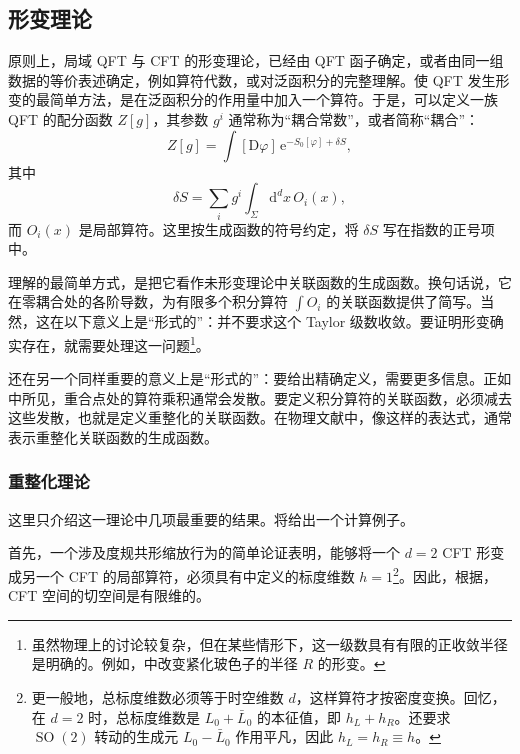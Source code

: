 \subsection{形变理论}\label{sec:3.2.5}

原则上，局域 QFT 与 CFT 的形变理论，已经由 QFT 函子确定，或者由同一组数据的等价表述确定，例如算符代数，或对泛函积分的完整理解。使 QFT 发生形变的最简单方法，是在泛函积分的作用量中加入一个算符。于是，可以定义一族 QFT 的配分函数 $Z[g]$，其参数 $g^i$ 通常称为“耦合常数”，或者简称“耦合”：
\begin{equation}\label{eq:3.71}
Z[g]=\int[\mathrm{D}\varphi]\,
\mathrm{e}^{-S_0[\varphi]+\delta S},
\end{equation}
其中
\begin{equation}\label{eq:3.72}
\delta S=\sum_i g^i\int_\Sigma\mathrm{d}^dx\,O_i(x),
\end{equation}
而 $O_i(x)$ 是局部算符。这里按生成函数的符号约定，将 $\delta S$ 写在指数的正号项中。

理解的最简单方式，是把它看作未形变理论中关联函数的生成函数。换句话说，它在零耦合处的各阶导数，为有限多个积分算符 $\int O_i$ 的关联函数提供了简写。当然，这在以下意义上是“形式的”：并不要求这个 Taylor 级数收敛。要证明形变确实存在，就需要处理这一问题\footnote{虽然物理上的讨论较复杂，但在某些情形下，这一级数具有有限的正收敛半径是明确的。例如，中改变紧化玻色子的半径 $R$ 的形变。}。

还在另一个同样重要的意义上是“形式的”：要给出精确定义，需要更多信息。正如中所见，重合点处的算符乘积通常会发散。要定义积分算符的关联函数，必须减去这些发散，也就是定义重整化的关联函数。在物理文献中，像这样的表达式，通常表示重整化关联函数的生成函数。

\subsubsection{重整化理论}\label{sec:3.2.5.1}

这里只介绍这一理论中几项最重要的结果。将给出一个计算例子。

首先，一个涉及度规共形缩放行为的简单论证表明，能够将一个 $d=2$ CFT 形变成另一个 CFT 的局部算符，必须具有中定义的标度维数 $h=1$\footnote{更一般地，总标度维数必须等于时空维数 $d$，这样算符才按密度变换。回忆，在 $d=2$ 时，总标度维数是 $L_0+\bar L_0$ 的本征值，即 $h_L+h_R$。还要求 $\operatorname{SO}(2)$ 转动的生成元 $L_0-\bar L_0$ 作用平凡，因此 $h_L=h_R\equiv h$。}。因此，根据，CFT 空间的切空间是有限维的。

